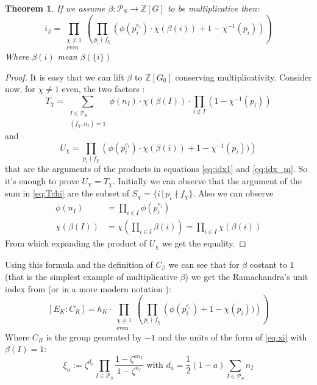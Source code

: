 \documentclass[]{article}
\theoremstyle{plain}
\newtheorem{teo}{Theorem}[section]
\theoremstyle{remark}
\theoremstyle{definition}
\newcommand{\PS}{\mathcal{P}_S}
\newcommand{\Z}{\mathbb{Z}}
\begin{document}
	\begin{teo}
		\label{teo:idx_m}
		If we assume $ \beta : \PS \to \Z[G] $ to be multiplicative then:
		\begin{equation}\label{eq:idx_m}
			i_\beta =  \prod_{ \substack{\chi \neq 1 \\ \text{even}}} \left( \prod_{p_i \nmid f_\chi} \left( \phi (p_i^{e_i}) \cdot \chi (\beta (i))  + 1- \chi^{-1} (p_i)\right)  \right) 
		\end{equation}
		Where $ \beta(i) $ mean $ \beta (\{i\})$
	\end{teo}

	\begin{proof}
		It is easy that we can lift $ \beta $ to $ \Z [G_0] $ conserving multiplicativity. Consider now, for $ \chi \neq 1 $ even, the two factors :
		\begin{equation}\label{eq:Tchi}
			T_\chi = \sum_{\substack{ I \in \PS \\ (f_\chi , n_I) = 1}} \phi (n_I) \cdot \chi (\beta (I)) \cdot \prod_{i \not \in  I} (1- \chi^{-1} (p_i)) 
		\end{equation}
		and 
		\begin{equation}\label{eq:Uchi}
			U_\chi = \prod_{p_i \nmid f_\chi} \left( \phi (p_i^{e_i}) \cdot \chi (\beta (i))  + 1- \chi^{-1} (p_i))\right)
		\end{equation}
		that are the arguments of the products in equations \ref{eq:idx1} and \ref{eq:idx_m}. So it's enough to prove $ U_\chi = T_\chi $. 
		Initially we can observe that the argument of the sum in \ref{eq:Tchi} are the subset of $ S_\chi = \{ i \,|\, p_i \nmid f_\chi \} $. Also we can observe 
		 \begin{align*}
		 	\phi (n_I ) & = \prod_{ i \in I} \phi(p_i^{e_i})\\
		 	\chi( \beta (I)) & = \chi \left(  \prod_{ i \in I} \beta(i) \right)  = \prod_{ i \in I} \chi(\beta (i))
		 \end{align*}
		 From which expanding the product of $ U_\chi $ we get the equality.
	\end{proof}

	Using this formula and the definition of $ C_\beta $ we can see that for $\beta$ costant to $ 1 $ (that is the simplest example of multiplicative $\beta$) we get the Ramachandra's unit index from \cite{RAM} (or in a more modern notation \cite[Theorem~8.3]{CF} ):
	\begin{equation}\label{eq:idx_ram}
		[E_K : C_R ] = h_K \cdot  \prod_{ \substack{\chi \neq 1 \\ \text{even}}} \left( \prod_{p_i \nmid f_\chi} \left( \phi (p_i^{e_i})  + 1- \chi (p_i))\right)  \right) 
	\end{equation}
	Where $ C_R $ is the group generated by $ -1 $ and the units of the form of \ref{eq:xi} with $ \beta(I) = 1  $:
	\[ \xi_a := \zeta ^{d_a } \prod _{I \in \PS} \frac{ 1 - \zeta^{an_I}}{ 1 - \zeta^{n_I}}  \text{ with } d_a =\frac{1}{2}(1-a) \sum_{I \in \PS} n_I\]
	
\end{document}

